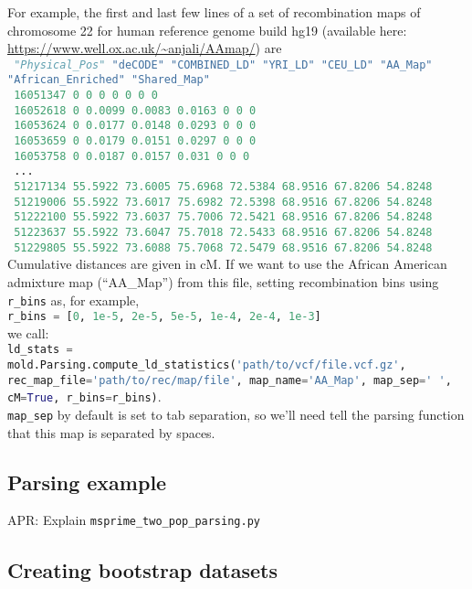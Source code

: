 \documentclass[10pt]{article}
\makeatletter
\renewcommand{\cite}{\citep}
\newcommand{\comment}[1]{{\color{blue}APR: #1}}
\newcommand{\py}[1]{\lstinline[breaklines=true,language=Python, showstringspaces=False]@#1@}
\makeatother
\begin{document}
For example, the first and last few lines of a set of recombination maps of chromosome 22 for human reference genome build hg19 (available here: \url{https://www.well.ox.ac.uk/~anjali/AAmap/}) are\\\small
\py{
"Physical_Pos" "deCODE" "COMBINED_LD" "YRI_LD" "CEU_LD" "AA_Map" "African_Enriched" "Shared_Map"}\\\py{
16051347 0 0 0 0 0 0 0}\\\py{
16052618 0 0.0099 0.0083 0.0163 0 0 0}\\\py{
16053624 0 0.0177 0.0148 0.0293 0 0 0}\\\py{
16053659 0 0.0179 0.0151 0.0297 0 0 0}\\\py{
16053758 0 0.0187 0.0157 0.031 0 0 0}\\\py{
...}\\\py{
51217134 55.5922 73.6005 75.6968 72.5384 68.9516 67.8206 54.8248}\\\py{
51219006 55.5922 73.6017 75.6982 72.5398 68.9516 67.8206 54.8248}\\\py{
51222100 55.5922 73.6037 75.7006 72.5421 68.9516 67.8206 54.8248}\\\py{
51223637 55.5922 73.6047 75.7018 72.5433 68.9516 67.8206 54.8248}\\\py{
51229805 55.5922 73.6088 75.7068 72.5479 68.9516 67.8206 54.8248}\\
\normalsize
Cumulative distances are given in cM.
If we want to use the \cite{Hinch2011} African American admixture map (``AA\_Map'') from this file, 
setting recombination bins using \py{r_bins} as, for example,\\
\py{r_bins = [0, 1e-5, 2e-5, 5e-5, 1e-4, 2e-4, 1e-3]}\\
we call:\\
\py{ld_stats = mold.Parsing.compute_ld_statistics('path/to/vcf/file.vcf.gz', rec_map_file='path/to/rec/map/file', map_name='AA_Map', map_sep=' ', cM=True, r_bins=r_bins)}.\\
\py{map_sep} by default is set to tab separation, so we'll need tell the parsing function that this map is separated by spaces.

\subsection{Parsing example}

\comment{Explain \py{msprime_two_pop_parsing.py}}

\subsection{Creating bootstrap datasets}\label{section:bootstrap}
\end{document}
